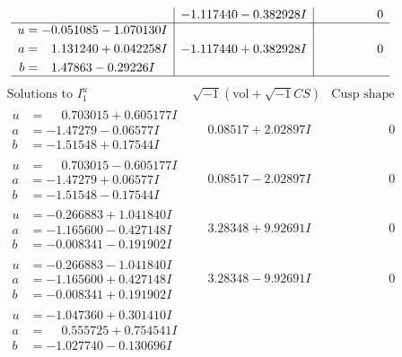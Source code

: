 \documentclass[1p]{elsarticle_modified}
\theoremstyle{definition}
\newcommand{\I}{\sqrt{-1}}
\begin{document}
$$\begin{array}{c|c|c}
 & -1.117440 - 0.382928 I & \phantom{-0.000000 } 0 \\ \hline\begin{aligned}
u &= -0.051085 - 1.070130 I \\
a &= \phantom{-}1.131240 + 0.042258 I \\
b &= \phantom{-}1.47863 - 0.29226 I\end{aligned}
 & -1.117440 + 0.382928 I & \phantom{-0.000000 } 0\\
 \hline 
 \end{array}$$\newpage$$\begin{array}{c|c|c}  
\text{Solutions to }I^u_{1}& \I (\text{vol} + \sqrt{-1}CS) & \text{Cusp shape}\\
 \hline 
\begin{aligned}
u &= \phantom{-}0.703015 + 0.605177 I \\
a &= -1.47279 - 0.06577 I \\
b &= -1.51548 + 0.17544 I\end{aligned}
 & \phantom{-}0.08517 + 2.02897 I & \phantom{-0.000000 } 0 \\ \hline\begin{aligned}
u &= \phantom{-}0.703015 - 0.605177 I \\
a &= -1.47279 + 0.06577 I \\
b &= -1.51548 - 0.17544 I\end{aligned}
 & \phantom{-}0.08517 - 2.02897 I & \phantom{-0.000000 } 0 \\ \hline\begin{aligned}
u &= -0.266883 + 1.041840 I \\
a &= -1.165600 - 0.427148 I \\
b &= -0.008341 - 0.191902 I\end{aligned}
 & \phantom{-}3.28348 + 9.92691 I & \phantom{-0.000000 } 0 \\ \hline\begin{aligned}
u &= -0.266883 - 1.041840 I \\
a &= -1.165600 + 0.427148 I \\
b &= -0.008341 + 0.191902 I\end{aligned}
 & \phantom{-}3.28348 - 9.92691 I & \phantom{-0.000000 } 0 \\ \hline\begin{aligned}
u &= -1.047360 + 0.301410 I \\
a &= \phantom{-}0.555725 + 0.754541 I \\
b &= -1.027740 - 0.130696 I\end{aligned}

\end{array}$$
\end{document}
